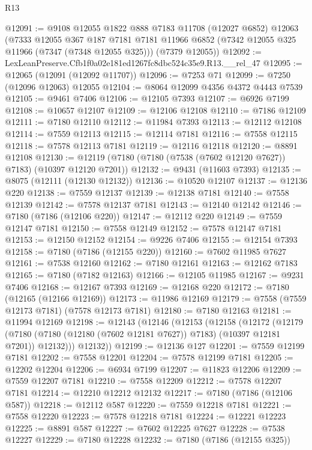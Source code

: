 \begin{lexlean}{R13}
\begin{coremodule}
@12091 := @9108
    @12055
    @1822
    @888
    @7183
    @11708
    (@12027 @6852)
    @12063
    (@7333
      @12055
      @367
      @187
      @7181
      @7181
      @11966
      @6852
      (@7342 @12055 @325 @11966 (@7347 (@7348 @12055 @325)))
      (@7379 @12055))
@12092 := LexLeanPreserve.Cfb1f0a02e181ed1267fc8dbc524c35e9.R13.__rel_47
@12095 := @12065 (@12091 (@12092 @11707))
@12096 := @7253 @71
@12099 := @7250 (@12096 @12063) @12055
@12104 := @8064 @12099 @4356 @4372 @4443 @7539
@12105 := @9461 @7406
@12106 := @12105 @7393
@12107 := @6926 @7199
@12108 := @10657 @12107
@12109 := @12106 @12108
@12110 := @7186 @12109
@12111 := @7180 @12110
@12112 := @11984 @7393
@12113 := @12112 @12108
@12114 := @7559 @12113
@12115 := @12114 @7181
@12116 := @7558 @12115
@12118 := @7578 @12113 @7181
@12119 := @12116 @12118
@12120 := @8891 @12108
@12130 := @12119 (@7180 (@7180 (@7538 (@7602 @12120 @7627)) @7183) (@10397 @12120 @7201))
@12132 := @9431 (@11603 @7393)
@12135 := @8075 (@12111 (@12130 @12132))
@12136 := @10520 @12107
@12137 := @12136 @220
@12138 := @7559 @12137
@12139 := @12138 @7181
@12140 := @7558 @12139
@12142 := @7578 @12137 @7181
@12143 := @12140 @12142
@12146 := @7180 (@7186 (@12106 @220))
@12147 := @12112 @220
@12149 := @7559 @12147 @7181
@12150 := @7558 @12149
@12152 := @7578 @12147 @7181
@12153 := @12150 @12152
@12154 := @9226 @7406
@12155 := @12154 @7393
@12158 := @7180 (@7186 (@12155 @220))
@12160 := @7602 @11985 @7627
@12161 := @7538 @12160
@12162 := @7180 @12161
@12163 := @12162 @7183
@12165 := @7180 (@7182 @12163)
@12166 := @12105 @11985
@12167 := @9231 @7406
@12168 := @12167 @7393
@12169 := @12168 @220
@12172 := @7180 (@12165 (@12166 @12169))
@12173 := @11986 @12169
@12179 := @7558 (@7559 @12173 @7181) (@7578 @12173 @7181)
@12180 := @7180 @12163
@12181 := @11994 @12169
@12198 := @12143
    (@12146
      (@12153
        (@12158
          (@12172
            (@12179
              (@7180 (@7180 (@12180 (@7602 @12181 @7627)) @7183) (@10397 @12181 @7201))
              @12132)))
        @12132))
@12199 := @12136 @127
@12201 := @7559 @12199 @7181
@12202 := @7558 @12201
@12204 := @7578 @12199 @7181
@12205 := @12202 @12204
@12206 := @6934 @7199
@12207 := @11823 @12206
@12209 := @7559 @12207 @7181
@12210 := @7558 @12209
@12212 := @7578 @12207 @7181
@12214 := @12210 @12212 @12132
@12217 := @7180 (@7186 (@12106 @587))
@12218 := @12112 @587
@12220 := @7559 @12218 @7181
@12221 := @7558 @12220
@12223 := @7578 @12218 @7181
@12224 := @12221 @12223
@12225 := @8891 @587
@12227 := @7602 @12225 @7627
@12228 := @7538 @12227
@12229 := @7180 @12228
@12232 := @7180 (@7186 (@12155 @325))

\end{coremodule}
\end{lexlean}
